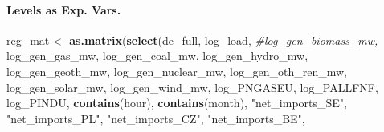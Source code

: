 \documentclass[
]{article}
\newenvironment{Shaded}{\begin{snugshade}}{\end{snugshade}}
\newcommand{\CommentTok}[1]{\textcolor[rgb]{0.56,0.35,0.01}{\textit{#1}}}
\newcommand{\FunctionTok}[1]{\textcolor[rgb]{0.13,0.29,0.53}{\textbf{#1}}}
\newcommand{\NormalTok}[1]{#1}
\newcommand{\OtherTok}[1]{\textcolor[rgb]{0.56,0.35,0.01}{#1}}
\newcommand{\StringTok}[1]{\textcolor[rgb]{0.31,0.60,0.02}{#1}}
\begin{document}
\paragraph{Levels as Exp. Vars.}\label{levels-as-exp.-vars.}

\begin{Shaded}
\begin{Highlighting}[]
\NormalTok{reg\_mat }\OtherTok{\textless{}{-}} \FunctionTok{as.matrix}\NormalTok{(}\FunctionTok{select}\NormalTok{(de\_full,}
                                       \StringTok{\textquotesingle{}log\_load\textquotesingle{}}\NormalTok{, }
                                       \CommentTok{\#\textquotesingle{}log\_gen\_biomass\_mw\textquotesingle{},}
                                       \StringTok{\textquotesingle{}log\_gen\_gas\_mw\textquotesingle{}}\NormalTok{, }
                                       \StringTok{\textquotesingle{}log\_gen\_coal\_mw\textquotesingle{}}\NormalTok{, }
                                       \StringTok{\textquotesingle{}log\_gen\_hydro\_mw\textquotesingle{}}\NormalTok{,}
                                       \StringTok{\textquotesingle{}log\_gen\_geoth\_mw\textquotesingle{}}\NormalTok{, }
                                       \StringTok{\textquotesingle{}log\_gen\_nuclear\_mw\textquotesingle{}}\NormalTok{, }
                                       \StringTok{\textquotesingle{}log\_gen\_oth\_ren\_mw\textquotesingle{}}\NormalTok{, }
                                       \StringTok{\textquotesingle{}log\_gen\_solar\_mw\textquotesingle{}}\NormalTok{, }
                                       \StringTok{\textquotesingle{}log\_gen\_wind\_mw\textquotesingle{}}\NormalTok{,}
                                       \StringTok{\textquotesingle{}log\_PNGASEU\textquotesingle{}}\NormalTok{, }
                                       \StringTok{\textquotesingle{}log\_PALLFNF\textquotesingle{}}\NormalTok{,}
                                       \StringTok{\textquotesingle{}log\_PINDU\textquotesingle{}}\NormalTok{,}
                                       \FunctionTok{contains}\NormalTok{(}\StringTok{\textquotesingle{}hour\textquotesingle{}}\NormalTok{), }
                                       \FunctionTok{contains}\NormalTok{(}\StringTok{\textquotesingle{}month\textquotesingle{}}\NormalTok{),}
                                       \StringTok{"net\_imports\_SE"}\NormalTok{,}
                                       \StringTok{"net\_imports\_PL"}\NormalTok{,}
                                       \StringTok{"net\_imports\_CZ"}\NormalTok{,}
                                       \StringTok{"net\_imports\_BE"}\NormalTok{,}

\end{Highlighting}
\end{Shaded}
\end{document}
